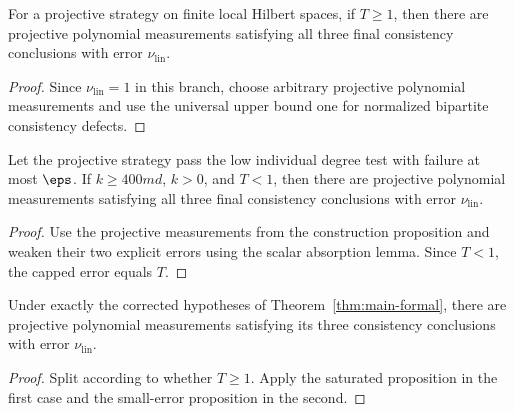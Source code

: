 \begin{proposition}
\label{prop:main-formal-linear-triangle-saturated}
	\leanok
	For a projective strategy on finite local Hilbert spaces, if $T\ge1$, then
	there are projective polynomial measurements satisfying all three final
	consistency conclusions with error $\nu_{\mathrm{lin}}$.
\end{proposition}
\begin{proof}
	\leanok
	Since $\nu_{\mathrm{lin}}=1$ in this branch, choose arbitrary projective
	polynomial measurements and use the universal upper bound one for normalized
	bipartite consistency defects.
\end{proof}

\begin{proposition}
\label{prop:main-formal-linear-triangle-small-error}
	\leanok
	Let the projective strategy pass the low individual degree test with failure
	at most $\eps$.  If $k\ge400md$, $k>0$, and $T<1$, then there are projective
	polynomial measurements satisfying all three final consistency conclusions
	with error $\nu_{\mathrm{lin}}$.
\end{proposition}
\begin{proof}
	\leanok
	Use the projective measurements from the construction proposition and weaken
	their two explicit errors using the scalar absorption lemma.  Since $T<1$,
	the capped error equals $T$.
\end{proof}

\begin{theorem}
\label{thm:main-formal-linear-triangle-named-error}
	\leanok
	Under exactly the corrected hypotheses of Theorem~\ref{thm:main-formal},
	there are projective polynomial measurements satisfying its three
	consistency conclusions with error $\nu_{\mathrm{lin}}$.
\end{theorem}
\begin{proof}
	\leanok
	Split according to whether $T\ge1$.  Apply the saturated proposition in the
	first case and the small-error proposition in the second.
\end{proof}

